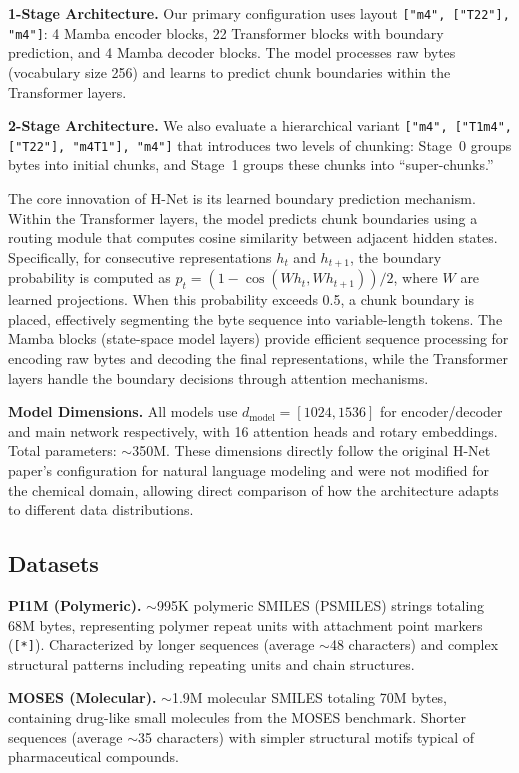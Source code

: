 \documentclass{article}
\newcommand{\hnet}{H-Net}
\begin{document}
\textbf{1-Stage Architecture.} Our primary configuration uses layout \texttt{["m4", ["T22"], "m4"]}: 4 Mamba encoder blocks, 22 Transformer blocks with boundary prediction, and 4 Mamba decoder blocks. The model processes raw bytes (vocabulary size 256) and learns to predict chunk boundaries within the Transformer layers.

\textbf{2-Stage Architecture.} We also evaluate a hierarchical variant \texttt{["m4", ["T1m4", ["T22"], "m4T1"], "m4"]} that introduces two levels of chunking: Stage~0 groups bytes into initial chunks, and Stage~1 groups these chunks into ``super-chunks.''

The core innovation of \hnet{} is its learned boundary prediction mechanism. Within the Transformer layers, the model predicts chunk boundaries using a routing module that computes cosine similarity between adjacent hidden states. Specifically, for consecutive representations $h_t$ and $h_{t+1}$, the boundary probability is computed as $p_t = (1 - \cos(Wh_t, Wh_{t+1}))/2$, where $W$ are learned projections. When this probability exceeds 0.5, a chunk boundary is placed, effectively segmenting the byte sequence into variable-length tokens. The Mamba blocks (state-space model layers) provide efficient sequence processing for encoding raw bytes and decoding the final representations, while the Transformer layers handle the boundary decisions through attention mechanisms.

\textbf{Model Dimensions.} All models use $d_{\text{model}} = [1024, 1536]$ for encoder/decoder and main network respectively, with 16 attention heads and rotary embeddings. Total parameters: $\sim$350M. These dimensions directly follow the original \hnet{} paper's configuration for natural language modeling and were not modified for the chemical domain, allowing direct comparison of how the architecture adapts to different data distributions.

\subsection{Datasets}

\textbf{PI1M (Polymeric).} $\sim$995K polymeric SMILES (PSMILES) strings totaling 68M bytes, representing polymer repeat units with attachment point markers (\texttt{[*]}). Characterized by longer sequences (average $\sim$48 characters) and complex structural patterns including repeating units and chain structures.

\textbf{MOSES (Molecular).} $\sim$1.9M molecular SMILES totaling 70M bytes, containing drug-like small molecules from the MOSES benchmark. Shorter sequences (average $\sim$35 characters) with simpler structural motifs typical of pharmaceutical compounds.
\end{document}
